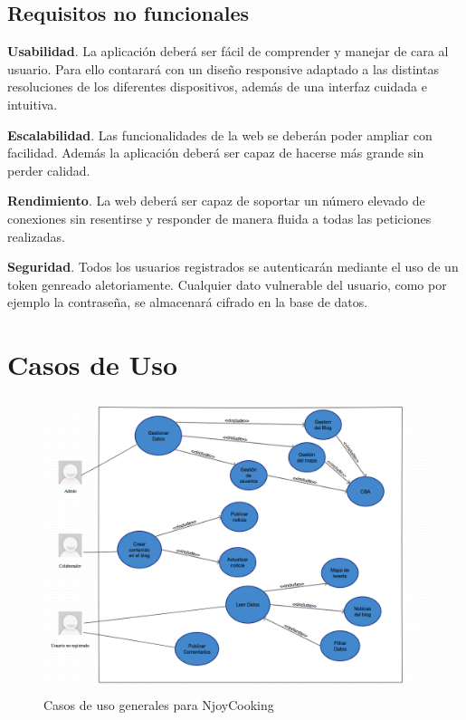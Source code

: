 \vspace{5 mm}


\subsection{Requisitos no funcionales}

\textbf{Usabilidad}. La aplicación deberá ser fácil de comprender y manejar de cara al usuario. Para ello contarará con un diseño responsive adaptado a las distintas resoluciones de  los diferentes dispositivos, además de una interfaz cuidada e intuitiva.

\vspace{5mm}

\textbf{Escalabilidad}. Las funcionalidades de la web se deberán poder ampliar con facilidad. Además la aplicación deberá ser capaz de hacerse más grande sin perder calidad.

\vspace{5mm}

\textbf{Rendimiento}. La web deberá ser capaz de soportar un número elevado de conexiones sin resentirse y responder de manera fluida a todas las peticiones realizadas.

\vspace{5mm}

\textbf{Seguridad}. Todos los usuarios registrados se autenticarán mediante el uso de un token genreado aletoriamente. Cualquier dato vulnerable del usuario, como por ejemplo la contraseña, se almacenará cifrado en la base de datos.

\section{Casos de Uso}


\begin{figure}
\begin{center}
\includegraphics[width=1.0\textwidth]{imagenes/casos-de-uso.png}
\caption{Casos de uso generales para NjoyCooking}
\label{casos_uso}
\end{center}
\end{figure}


